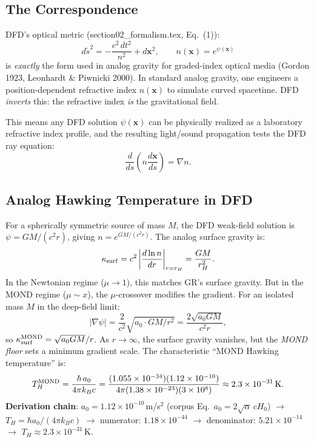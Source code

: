 \documentclass[11pt]{article}
\newcommand{\ee}[1]{\times 10^{#1}}
\begin{document}
\subsection{The Correspondence}

DFD's optical metric (section02\_formalism.tex, Eq.~(1)):
\begin{equation}
d\tilde{s}^2 = -\frac{c^2\,dt^2}{n^2} + d\mathbf{x}^2,
\qquad n(\mathbf{x}) = e^{\psi(\mathbf{x})}
\label{eq:optical-metric}
\end{equation}
is \emph{exactly} the form used in analog gravity for graded-index
optical media (Gordon 1923, Leonhardt \& Piwnicki 2000). In standard
analog gravity, one engineers a position-dependent refractive index
$n(\mathbf{x})$ to simulate curved spacetime. DFD \emph{inverts} this:
the refractive index \emph{is} the gravitational field.

This means any DFD solution $\psi(\mathbf{x})$ can be physically
realized as a laboratory refractive index profile, and the resulting
light/sound propagation tests the DFD ray equation:
\begin{equation}
\frac{d}{ds}\left(n\frac{d\mathbf{x}}{ds}\right) = \nabla n.
\end{equation}

\subsection{Analog Hawking Temperature in DFD}

For a spherically symmetric source of mass $M$, the DFD weak-field
solution is $\psi = GM/(c^2 r)$, giving $n = e^{GM/(c^2 r)}$. The
analog surface gravity is:
\begin{equation}
\kappa_{\rm surf} = c^2 \left|\frac{d\ln n}{dr}\right|_{r=r_H}
= \frac{GM}{r_H^2}.
\end{equation}
In the Newtonian regime ($\mu \to 1$), this matches GR's surface
gravity. But in the MOND regime ($\mu \sim x$), the $\mu$-crossover
modifies the gradient. For an isolated mass $M$ in the deep-field
limit:
\begin{equation}
|\nabla\psi| = \frac{2}{c^2}\sqrt{a_0 \cdot GM/r^2}
= \frac{2\sqrt{a_0 G M}}{c^2 r},
\end{equation}
so $\kappa_{\rm surf}^{\rm MOND} = \sqrt{a_0 G M}/r$. As $r \to \infty$,
the surface gravity vanishes, but the \emph{MOND floor} sets a minimum
gradient scale. The characteristic ``MOND Hawking temperature'' is:
\begin{equation}
T_H^{\rm MOND} = \frac{\hbar\,a_0}{4\pi k_B c}
= \frac{(1.055\ee{-34})(1.12\ee{-10})}{4\pi (1.38\ee{-23})(3\ee{8})}
\approx 2.3\ee{-31}\,\text{K}.
\end{equation}
\textbf{Derivation chain}: $a_0 = 1.12\ee{-10}\,$m/s$^2$ (corpus
Eq.~$a_0 = 2\sqrt{\alpha}\,cH_0$) $\to$ $T_H = \hbar a_0/(4\pi k_B c)$
$\to$ numerator: $1.18\ee{-44}$ $\to$ denominator: $5.21\ee{-14}$
$\to$ $T_H \approx 2.3\ee{-31}\,$K.
\end{document}

